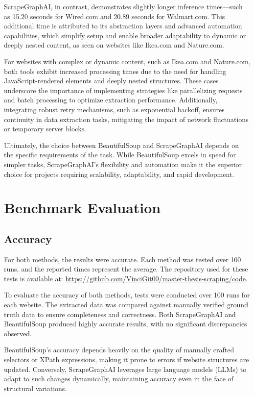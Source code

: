 ScrapeGraphAI, in contrast, demonstrates slightly longer inference times—such as 15.20 seconds for Wired.com and 20.89 seconds for Walmart.com. This additional time is attributed to its abstraction layers and advanced automation capabilities, which simplify setup and enable broader adaptability to dynamic or deeply nested content, as seen on websites like Ikea.com and Nature.com.

For websites with complex or dynamic content, such as Ikea.com and Nature.com, both tools exhibit increased processing times due to the need for handling JavaScript-rendered elements and deeply nested structures. These cases underscore the importance of implementing strategies like parallelizing requests and batch processing to optimize extraction performance. Additionally, integrating robust retry mechanisms, such as exponential backoff, ensures continuity in data extraction tasks, mitigating the impact of network fluctuations or temporary server blocks.

Ultimately, the choice between BeautifulSoup and ScrapeGraphAI depends on the specific requirements of the task. While BeautifulSoup excels in speed for simpler tasks, ScrapeGraphAI's flexibility and automation make it the superior choice for projects requiring scalability, adaptability, and rapid development.
\section{Benchmark Evaluation}

\subsection{Accuracy}

For both methods, the results were accurate. Each method was tested over 100 runs, and the reported times represent the average. The repository used for these tests is available at: \url{https://github.com/VinciGit00/master-thesis-scraping/code}.

To evaluate the accuracy of both methods, tests were conducted over 100 runs for each website. The extracted data was compared against manually verified ground truth data to ensure completeness and correctness. Both ScrapeGraphAI and BeautifulSoup produced highly accurate results, with no significant discrepancies observed.

BeautifulSoup's accuracy depends heavily on the quality of manually crafted selectors or XPath expressions, making it prone to errors if website structures are updated. Conversely, ScrapeGraphAI leverages large language models (LLMs) to adapt to such changes dynamically, maintaining accuracy even in the face of structural variations.



